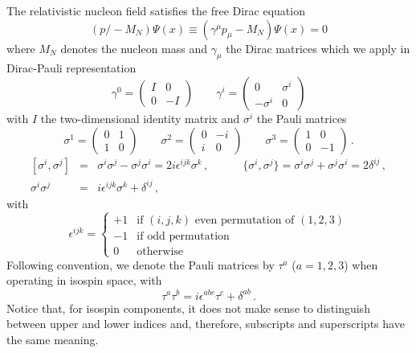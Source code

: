 \documentclass[sort&compress,preprint,3p]{elsarticle}
\begin{document}
The relativistic nucleon field satisfies the free
Dirac equation
\begin{equation}
\left(p\!\!\! \slash  - M_N \right) \Psi(x) \equiv
\left(\gamma^\mu p_\mu  - M_N \right) \Psi(x) 
= 0
\label{eq_Dirac}
\end{equation}
where $M_N$ denotes the nucleon mass and $\gamma_\mu$ the Dirac matrices which we apply
in Dirac-Pauli representation
\begin{equation}
\gamma^0 = \left( \begin{array}{cc} I & 0 \\ 0 & -I \end{array} \right) 
\quad \quad
\gamma^i = \left( \begin{array}{cc} 0 & \sigma^i \\ -\sigma^i & 0 \end{array} \right) 
\end{equation}
with $I$ the two-dimensional identity matrix and $\sigma^i$ the Pauli matrices
\begin{equation}
\sigma^1 = \left( \begin{array}{cc} 0 & 1 \\ 1 & 0 \end{array} \right) 
\quad \quad
\sigma^2 = \left( \begin{array}{cc} 0 &-i \\ i & 0 \end{array} \right) 
\quad \quad
\sigma^3 = \left( \begin{array}{cc} 1 & 0 \\ 0 &-1 \end{array} \right) 
\,. 
\end{equation}
\begin{eqnarray}
\left[ \sigma^i , \sigma^j \right] & = & 
\sigma^i \sigma^j - \sigma^j \sigma^i = 
2 i \epsilon^{ijk} \sigma^k \,,
\quad \quad \quad
\{\sigma^i,\sigma^j \} =
\sigma^i \sigma^j+ \sigma^j \sigma^i 
= 2\delta^{ij} \,,
\\
\sigma^i \sigma^j &=&
i \epsilon^{ijk} \sigma^k + \delta^{ij} \,,
\end{eqnarray}
with
\begin{equation}
\epsilon^{ijk} = \left\{ \begin{array}{ll}
                    +1 & \mbox{if $(i,j,k)$ even permutation of $(1,2,3)$}\\
                    -1 & \mbox{if odd permutation} \\
                     0 & \mbox{otherwise}
                         \end{array}
                 \right.
\end{equation}
Following convention, we denote the Pauli matrices
by $\tau^a$ ($a=1,2,3$) when operating in isospin space,
with
\begin{equation}
\tau^a \tau^b =
i \epsilon^{abc} \tau^c + \delta^{ab} \,.
\end{equation}
Notice that, for isospin components, it does not make sense to
distinguish between upper and lower indices and, therefore,
subscripts and superscripts have the same meaning. 
\end{document}
